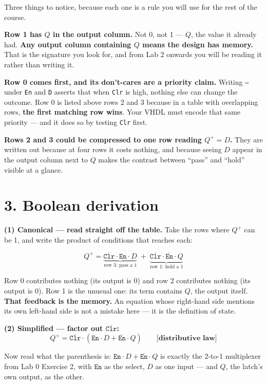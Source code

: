 \documentclass[11pt]{article}
\newcommand{\code}[1]{\texttt{#1}}
\begin{document}
Three things to notice, because each one is a rule you will use for the rest of the
course.

\textbf{Row 1 has $Q$ in the output column.} Not 0, not 1 --- $Q$, the value it
already had. \textbf{Any output column containing $Q$ means the design has memory.}
That is the signature you look for, and from Lab 2 onwards you will be reading it
rather than writing it.

\textbf{Row 0 comes first, and its don't-cares are a priority claim.} Writing
\code{--} under \code{En} and \code{D} asserts that when \code{Clr} is high, nothing
else can change the outcome. Row 0 is listed above rows 2 and 3 because in a table
with overlapping rows, \textbf{the first matching row wins}. Your VHDL must encode
that same priority --- and it does so by testing \code{Clr} first.

\textbf{Rows 2 and 3 could be compressed to one row reading $Q^{+} = D$.} They are
written out because at four rows it costs nothing, and because seeing $D$ appear in
the output column next to $Q$ makes the contrast between ``pass'' and ``hold''
visible at a glance.

\section*{3. Boolean derivation}

\textbf{(1) Canonical --- read straight off the table.} Take the rows where
$Q^{+}$ can be 1, and write the product of conditions that reaches each:

\[
Q^{+} = \underbrace{\overline{\code{Clr}} \cdot \code{En} \cdot D}_{\text{row 3: pass a 1}}
\;+\;
\underbrace{\overline{\code{Clr}} \cdot \overline{\code{En}} \cdot Q}_{\text{row 1: hold a 1}}
\]

Row 0 contributes nothing (its output is 0) and row 2 contributes nothing (its
output is 0). Row 1 is the unusual one: its term contains $Q$, the output itself.
\textbf{That feedback is the memory.} An equation whose right-hand side mentions its
own left-hand side is not a mistake here --- it is the definition of state.

\textbf{(2) Simplified --- factor out $\overline{\code{Clr}}$:}
\[
Q^{+} = \boxed{\overline{\code{Clr}} \cdot \left( \code{En} \cdot D + \overline{\code{En}} \cdot Q \right)}
\qquad \textbf{[distributive law]}
\]

Now read what the parenthesis is: $\code{En}\cdot D + \overline{\code{En}}\cdot Q$ is
exactly the 2-to-1 multiplexer from Lab 0 Exercise 2, with $\code{En}$ as the select,
$D$ as one input --- and $Q$, the latch's own output, as the other.
\end{document}
